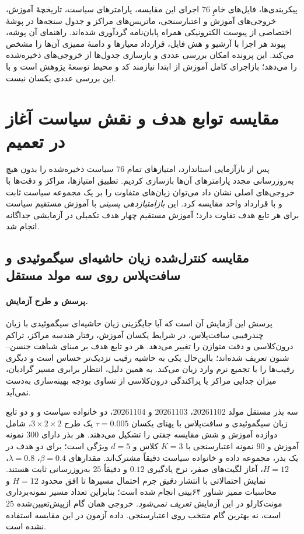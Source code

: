 پیکربندی‌ها، فایل‌های خامِ $76$ اجرای این مقایسه، پارامترهای سیاست، تاریخچهٔ آموزش، خروجی‌های آموزش و اعتبارسنجی، ماتریس‌های مراکز و جدول سنجه‌ها در پوشهٔ اختصاصی  از پیوست الکترونیکی همراه پایان‌نامه گردآوری شده‌اند. راهنمای آن پوشه، پیوند هر اجرا با آرشیو و هش فایل، قرارداد معیارها و دامنهٔ ممیزی آن‌ها را مشخص می‌کند. این پرونده امکان بررسی عددی و بازسازی جدول‌ها از خروجی‌های ذخیره‌شده را می‌دهد؛ بازاجرای کامل آموزش از ابتدا نیازمند کد و محیط توسعهٔ پژوهش است و با این بررسی عددی یکسان نیست.

\section{مقایسه توابع هدف و نقش سیاست آغاز در تعمیم}
\label{sec:ch4-objective-start-diagnostics}
پس از بازآزمایی استاندارد، امتیازهای تمام $76$ سیاست ذخیره‌شده
را بدون هیچ به‌روزرسانی مجدد پارامترهای آن‌ها بازسازی کردیم.
تطبیق امتیازها، مراکز و دقت‌ها با خروجی‌های اصلی نشان داد
می‌توان زیان‌های متفاوت را بر یک مجموعه سیاست ثابت و با
قرارداد واحد مقایسه کرد. این \emph{بازامتیازدهی پسینی}
با آموزش مستقیم سیاست برای هر تابع هدف تفاوت دارد؛
آموزش مستقیم چهار هدف تکمیلی در آزمایشی جداگانه انجام شد.

\subsection{مقایسه کنترل‌شده زیان حاشیه‌ای سیگموئیدی و سافت‌پلاس روی سه مولد مستقل}
\label{subsec:ch4-e13-loss-controlled}
\paragraph{پرسش و طرح آزمایش.}
پرسش این آزمایش آن است که آیا جایگزینی زیان حاشیه‌ای سیگموئیدی
با زیان چندرقیبی سافت‌پلاس، در شرایط یکسان آموزش، رفتار
هندسه مراکز، تراکم درون‌کلاسی و دقت متوازن را تغییر می‌دهد.
هر دو تابع هدف بر مبنای شباهت جنسن--شنون تعریف شده‌اند؛
بااین‌حال یکی به حاشیه رقیب نزدیک‌تر حساس است و دیگری
رقیب‌ها را با تجمیع نرم وارد زیان می‌کند.
به همین دلیل، انتظار برابری مسیر گرادیان، میزان جدایی مراکز
یا پراکندگی درون‌کلاسی از تساوی بودجه بهینه‌سازی به‌دست نمی‌آید.

سه بذر مستقل مولد
$20261102$، $20261103$ و $20261104$،
دو خانواده سیاست  و  و دو تابع زیان
سیگموئیدی و سافت‌پلاس با پهنای یکسان $\tau=0.005$
یک طرح $3\times2\times2$، شامل دوازده آموزش و شش
مقایسه جفتی را تشکیل می‌دهند. هر بذر دارای $300$ نمونه
آموزش و $90$ نمونه اعتبارسنجی با $K=3$ کلاس و $d=5$
ویژگی است؛ برای دو هدف در یک بذر، مجموعه داده و خانواده سیاست
دقیقاً مشترک‌اند. مقدارهای $\beta=0.4$، $\lambda=0.8$،
$H=12$، آغاز لگیت‌های صفر، نرخ یادگیری $0.12$
و دقیقاً $25$ به‌روزرسانی  ثابت هستند.
نمایش احتمالاتی با انتشار \emph{دقیق} جرم احتمال مسیرها تا
افق محدود $H=12$ و محاسبات ممیز شناور ۶۴بیتی انجام شده است؛
بنابراین تعداد مسیر نمونه‌برداری مونت‌کارلو در این آزمایش
\emph{تعریف نمی‌شود}. خروجی همان گام ازپیش‌تعیین‌شده $25$
است، نه بهترین گام منتخب روی اعتبارسنجی. داده آزمون در
این مقایسه استفاده نشده است.

